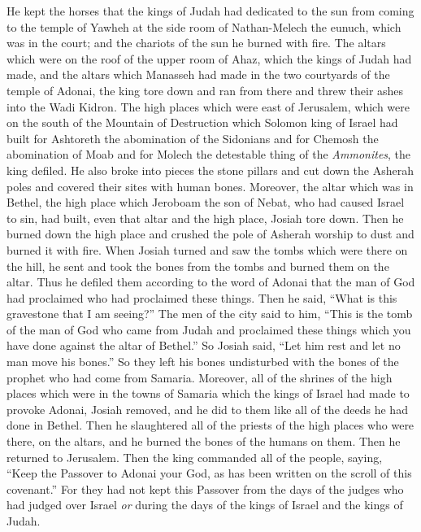 \begin{biblechapter}
\verse He kept the horses that the kings of Judah had dedicated to the sun from coming to the temple of Yawheh at the side room of Nathan-Melech the eunuch, which was in the court; and the chariots of the sun he burned with fire.
\verse The altars which were on the roof of the upper room of Ahaz, which the kings of Judah had made, and the altars which Manasseh had made in the two courtyards of the temple of Adonai, the king tore down and ran from there and threw their ashes into the Wadi Kidron.
\verse The high places which were east of Jerusalem, which were on the south of the Mountain of Destruction which Solomon king of Israel had built for Ashtoreth the abomination of the Sidonians and for Chemosh the abomination of Moab and for Molech the detestable thing of the \textit{Ammonites}, the king defiled.
\verse He also broke into pieces the stone pillars and cut down the Asherah poles and covered their sites with human bones.
\verse Moreover, the altar which was in Bethel, the high place which Jeroboam the son of Nebat, who had caused Israel to sin, had built, even that altar and the high place, Josiah tore down. Then he burned down the high place and crushed the pole of Asherah worship to dust and burned it with fire.
\verse When Josiah turned and saw the tombs which were there on the hill, he sent and took the bones from the tombs and burned them on the altar. Thus he defiled them according to the word of Adonai that the man of God had proclaimed who had proclaimed these things.
\verse Then he said, “What is this gravestone that I am seeing?” The men of the city said to him, “This is the tomb of the man of God who came from Judah and proclaimed these things which you have done against the altar of Bethel.”
\verse So Josiah said, “Let him rest and let no man move his bones.” So they left his bones undisturbed with the bones of the prophet who had come from Samaria.
\verse Moreover, all of the shrines of the high places which were in the towns of Samaria which the kings of Israel had made to provoke Adonai, Josiah removed, and he did to them like all of the deeds he had done in Bethel.
\verse Then he slaughtered all of the priests of the high places who were there, on the altars, and he burned the bones of the humans on them. Then he returned to Jerusalem.
 Then the king commanded all of the people, saying, “Keep the Passover to Adonai your God, as has been written on the scroll of this covenant.”
\verse For they had not kept this Passover from the days of the judges who had judged over Israel \textit{or} during the days of the kings of Israel and the kings of Judah.

\end{biblechapter}
